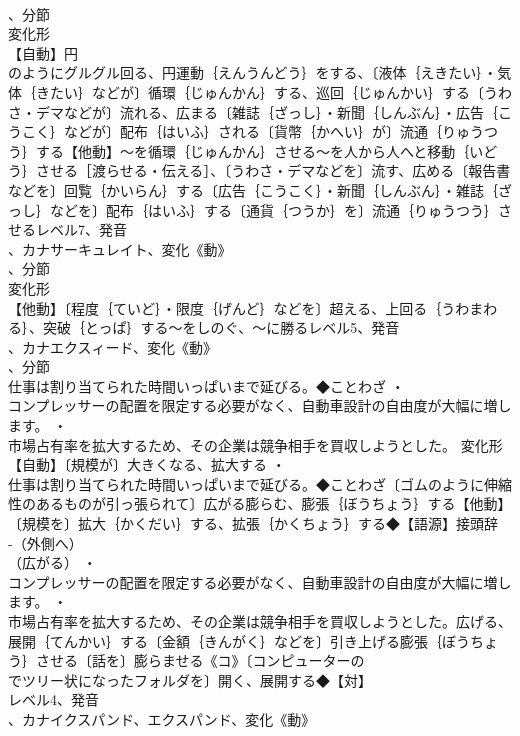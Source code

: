 \documentclass[8pt]{extreport}
\begin{document}
\begin{CJK}{UTF8}{min}
\\	、分節
\\	変化形 
\\	【自動】円
\\	のようにグルグル回る、円運動｛えんうんどう｝をする、〔液体｛えきたい｝・気体｛きたい｝などが〕循環｛じゅんかん｝する、巡回｛じゅんかい｝する〔うわさ・デマなどが〕流れる、広まる〔雑誌｛ざっし｝・新聞｛しんぶん｝・広告｛こうこく｝などが〕配布｛はいふ｝される〔貨幣｛かへい｝が〕流通｛りゅうつう｝する【他動】～を循環｛じゅんかん｝させる～を人から人へと移動｛いどう｝させる［渡らせる・伝える］、〔うわさ・デマなどを〕流す、広める〔報告書などを〕回覧｛かいらん｝する〔広告｛こうこく｝・新聞｛しんぶん｝・雑誌｛ざっし｝などを〕配布｛はいふ｝する〔通貨｛つうか｝を〕流通｛りゅうつう｝させるレベル7、発音
\\	、カナサーキュレイト、変化《動》
\\	、分節
\\	変化形 
\\	【他動】〔程度｛ていど｝・限度｛げんど｝などを〕超える、上回る｛うわまわる｝、突破｛とっぱ｝する～をしのぐ、～に勝るレベル5、発音
\\	、カナエクスィード、変化《動》
\\	、分節
\\	仕事は割り当てられた時間いっぱいまで延びる。◆ことわざ ・
\\	コンプレッサーの配置を限定する必要がなく、自動車設計の自由度が大幅に増します。 ・
\\	市場占有率を拡大するため、その企業は競争相手を買収しようとした。	変化形 
\\	【自動】〔規模が〕大きくなる、拡大する ・
\\	仕事は割り当てられた時間いっぱいまで延びる。◆ことわざ〔ゴムのように伸縮性のあるものが引っ張られて〕広がる膨らむ、膨張｛ぼうちょう｝する【他動】〔規模を〕拡大｛かくだい｝する、拡張｛かくちょう｝する◆【語源】接頭辞
\\	-（外側へ）
\\	（広がる） ・
\\	コンプレッサーの配置を限定する必要がなく、自動車設計の自由度が大幅に増します。 ・
\\	市場占有率を拡大するため、その企業は競争相手を買収しようとした。広げる、展開｛てんかい｝する〔金額｛きんがく｝などを〕引き上げる膨張｛ぼうちょう｝させる〔話を〕膨らませる《コ》〔コンピューターの
\\	でツリー状になったフォルダを〕開く、展開する◆【対】
\\	レベル4、発音
\\	、カナイクスパンド、エクスパンド、変化《動》

\end{CJK}
\end{document}
